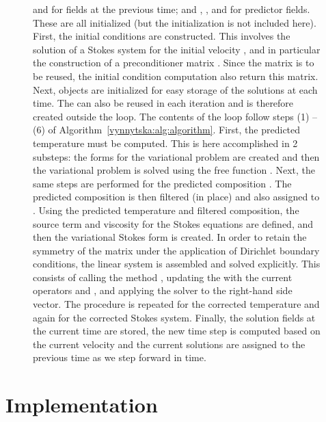 \begin{figure}[!p]
{      and  for fields at the previous time;
      and , , and  for predictor
      fields. These  are all initialized (but the
      initialization is not included here).
      First, the initial conditions are constructed. This involves the
      solution of a Stokes system for the initial velocity ,
      and in particular the construction of a preconditioner matrix
      . Since the matrix is to be reused, the initial
      condition computation also return this matrix. Next,
       objects are initialized for easy storage of
      the solutions at each time. The  can also be
      reused in each iteration and is therefore created outside the
      loop. The contents of the loop follow steps (1) -- (6) of
      Algorithm~\ref{vynnytska:alg:algorithm}. First, the predicted
      temperature  must be computed. This is here accomplished in 2 substeps: the forms for the variational problem are created and then the variational problem is solved using the free function . Next, the same steps are
      performed for the predicted composition . The
      predicted composition is then filtered (in place) and also
      assigned to . Using the predicted temperature and filtered composition, the
      source term and viscosity for the Stokes equations are defined,
      and then the variational Stokes form is created. In order to
      retain the symmetry of the matrix under the application of
      Dirichlet boundary conditions, the linear system is assembled
      and solved explicitly. This consists of calling the method
      , updating the  with
      the current operators  and , and applying the
      solver to the right-hand side vector. The procedure is repeated
      for the corrected temperature and again for the corrected Stokes
      system. Finally, the solution fields at the current time are stored, the
      new time step  is computed based on the current velocity
      and the current solutions are assigned to the previous time as
      we step forward in time.}\label{vynnytska:fig:mainalgorithm}
\end{figure}


\vspace*{-5pt}
\section{Implementation}

